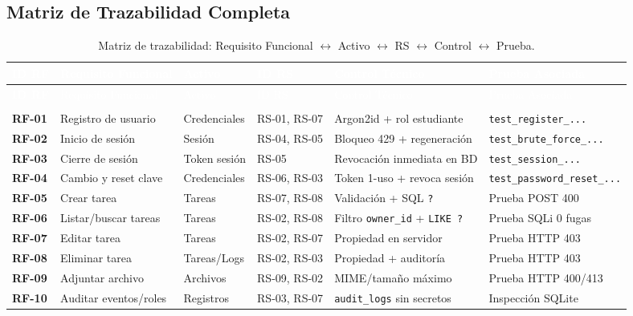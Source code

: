 \documentclass[12pt,a4paper]{article}
\begin{document}
\subsection{Matriz de Trazabilidad Completa}
\begin{longtable}{>{\bfseries\centering\arraybackslash}p{1.2cm} >{\raggedright\arraybackslash}p{3.1cm} >{\raggedright\arraybackslash}p{2.2cm} >{\centering\arraybackslash}p{1.6cm} >{\raggedright\arraybackslash}p{3.1cm} >{\raggedright\arraybackslash}p{2.5cm}}
\caption{Matriz de trazabilidad: Requisito Funcional $\leftrightarrow$ Activo $\leftrightarrow$ RS $\leftrightarrow$ Control $\leftrightarrow$ Prueba.}
\label{tab:trazabilidad} \\
\hline
\rowcolor{unsaacMaroon} \textcolor{white}{ID RF} & \textcolor{white}{Requisito Funcional} & \textcolor{white}{Activo} & \textcolor{white}{ID RS} & \textcolor{white}{Control Técnico} & \textcolor{white}{Prueba Asociada} \\
\hline
\endfirsthead
\hline
\rowcolor{unsaacMaroon} \textcolor{white}{ID RF} & \textcolor{white}{Requisito Funcional} & \textcolor{white}{Activo} & \textcolor{white}{ID RS} & \textcolor{white}{Control Técnico} & \textcolor{white}{Prueba Asociada} \\
\hline
\endhead
\multicolumn{6}{r}{\footnotesize\textit{Continúa en la página siguiente...}} \\
\endfoot
\hline
\endlastfoot
RF-01 & Registro de usuario & Credenciales & RS-01, RS-07 & Argon2id + rol estudiante & \texttt{test\_register\_...} \\
\rowcolor{rowAlt} RF-02 & Inicio de sesión & Sesión & RS-04, RS-05 & Bloqueo 429 + regeneración & \texttt{test\_brute\_force\_...} \\
RF-03 & Cierre de sesión & Token sesión & RS-05 & Revocación inmediata en BD & \texttt{test\_session\_...} \\
\rowcolor{rowAlt} RF-04 & Cambio y reset clave & Credenciales & RS-06, RS-03 & Token 1-uso + revoca sesión & \texttt{test\_password\_reset\_...} \\
RF-05 & Crear tarea & Tareas & RS-07, RS-08 & Validación + SQL \texttt{?} & Prueba POST 400 \\
\rowcolor{rowAlt} RF-06 & Listar/buscar tareas & Tareas & RS-02, RS-08 & Filtro \texttt{owner\_id} + \texttt{LIKE ?} & Prueba SQLi 0 fugas \\
RF-07 & Editar tarea & Tareas & RS-02, RS-07 & Propiedad en servidor & Prueba HTTP 403 \\
\rowcolor{rowAlt} RF-08 & Eliminar tarea & Tareas/Logs & RS-02, RS-03 & Propiedad + auditoría & Prueba HTTP 403 \\
RF-09 & Adjuntar archivo & Archivos & RS-09, RS-02 & MIME/tamaño máximo & Prueba HTTP 400/413 \\
\rowcolor{rowAlt} RF-10 & Auditar eventos/roles & Registros & RS-03, RS-07 & \texttt{audit\_logs} sin secretos & Inspección SQLite \\
\end{longtable}
\end{document}

